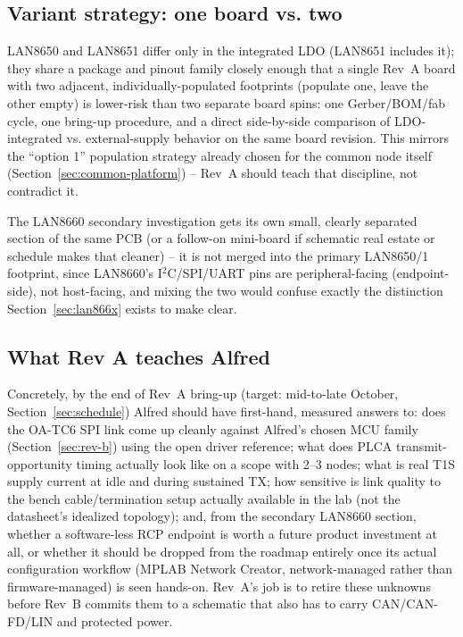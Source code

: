 \subsection{Variant strategy: one board vs. two}

\begin{decision}[title={Recommendation: one board, dual footprint}]
LAN8650 and LAN8651 differ only in the integrated LDO (LAN8651 includes it); they share a package and pinout family closely enough that a single Rev~A board with two adjacent, individually-populated footprints (populate one, leave the other empty) is lower-risk than two separate board spins: one Gerber/BOM/fab cycle, one bring-up procedure, and a direct side-by-side comparison of LDO-integrated vs. external-supply behavior on the same board revision. This mirrors the ``option 1'' population strategy already chosen for the common node itself (Section~\ref{sec:common-platform}) -- Rev~A should teach that discipline, not contradict it.
\end{decision}

The LAN8660 secondary investigation gets its own small, clearly separated section of the same PCB (or a follow-on mini-board if schematic real estate or schedule makes that cleaner) -- it is not merged into the primary LAN8650/1 footprint, since LAN8660's I$^2$C/SPI/UART pins are peripheral-facing (endpoint-side), not host-facing, and mixing the two would confuse exactly the distinction Section~\ref{sec:lan866x} exists to make clear.

\subsection{What Rev A teaches Alfred}

Concretely, by the end of Rev~A bring-up (target: mid-to-late October, Section~\ref{sec:schedule}) Alfred should have first-hand, measured answers to: does the OA-TC6 SPI link come up cleanly against Alfred's chosen MCU family (Section~\ref{sec:rev-b}) using the open driver reference; what does PLCA transmit-opportunity timing actually look like on a scope with 2--3 nodes; what is real T1S supply current at idle and during sustained TX; how sensitive is link quality to the bench cable/termination setup actually available in the lab (not the datasheet's idealized topology); and, from the secondary LAN8660 section, whether a software-less RCP endpoint is worth a future product investment at all, or whether it should be dropped from the roadmap entirely once its actual configuration workflow (MPLAB Network Creator, network-managed rather than firmware-managed) is seen hands-on. Rev~A's job is to retire these unknowns before Rev~B commits them to a schematic that also has to carry CAN/CAN-FD/LIN and protected power.
